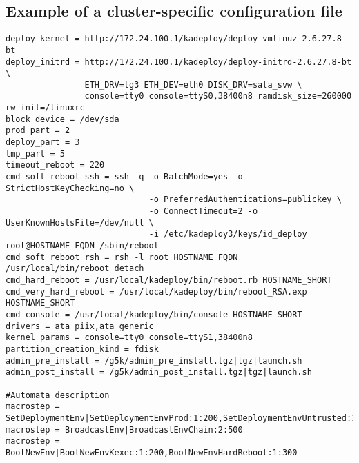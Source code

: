 \documentclass[a4wide,10pt,oneside]{book}
\begin{document}
\subsection{Example of a cluster-specific configuration file}
\begin{small}
\begin{verbatim}
deploy_kernel = http://172.24.100.1/kadeploy/deploy-vmlinuz-2.6.27.8-bt
deploy_initrd = http://172.24.100.1/kadeploy/deploy-initrd-2.6.27.8-bt \
                ETH_DRV=tg3 ETH_DEV=eth0 DISK_DRV=sata_svw \
                console=tty0 console=ttyS0,38400n8 ramdisk_size=260000 rw init=/linuxrc
block_device = /dev/sda
prod_part = 2
deploy_part = 3
tmp_part = 5
timeout_reboot = 220
cmd_soft_reboot_ssh = ssh -q -o BatchMode=yes -o StrictHostKeyChecking=no \
                             -o PreferredAuthentications=publickey \
                             -o ConnectTimeout=2 -o UserKnownHostsFile=/dev/null \
                             -i /etc/kadeploy3/keys/id_deploy root@HOSTNAME_FQDN /sbin/reboot
cmd_soft_reboot_rsh = rsh -l root HOSTNAME_FQDN /usr/local/bin/reboot_detach
cmd_hard_reboot = /usr/local/kadeploy/bin/reboot.rb HOSTNAME_SHORT
cmd_very_hard_reboot = /usr/local/kadeploy/bin/reboot_RSA.exp HOSTNAME_SHORT
cmd_console = /usr/local/kadeploy/bin/console HOSTNAME_SHORT
drivers = ata_piix,ata_generic
kernel_params = console=tty0 console=ttyS1,38400n8
partition_creation_kind = fdisk
admin_pre_install = /g5k/admin_pre_install.tgz|tgz|launch.sh
admin_post_install = /g5k/admin_post_install.tgz|tgz|launch.sh

#Automata description
macrostep = SetDeploymentEnv|SetDeploymentEnvProd:1:200,SetDeploymentEnvUntrusted:1:400
macrostep = BroadcastEnv|BroadcastEnvChain:2:500
macrostep = BootNewEnv|BootNewEnvKexec:1:200,BootNewEnvHardReboot:1:300
\end{verbatim}
\end{small}
\end{document}
